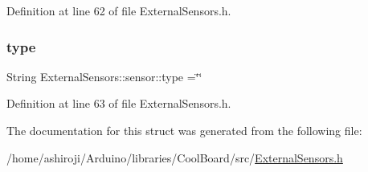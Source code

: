 Definition at line 62 of file External\+Sensors.\+h.

\mbox{\label{struct_external_sensors_1_1sensor_a6acfdb02c742c2110d7bd2b5d9fce9e7}} 
\subsubsection{\texorpdfstring{type}{type}}
{\footnotesize\ttfamily String External\+Sensors\+::sensor\+::type =\char`\"{}\char`\"{}}



Definition at line 63 of file External\+Sensors.\+h.



The documentation for this struct was generated from the following file\+:\begin{DoxyCompactItemize}
\item 
/home/ashiroji/\+Arduino/libraries/\+Cool\+Board/src/\hyperlink{_external_sensors_8h}{External\+Sensors.\+h}\end{DoxyCompactItemize}
